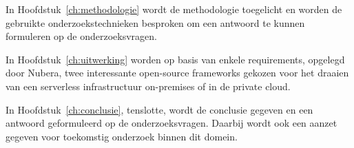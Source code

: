 In Hoofdstuk~\ref{ch:methodologie} wordt de methodologie toegelicht en worden de gebruikte onderzoekstechnieken besproken om een antwoord te kunnen formuleren op de onderzoeksvragen.

In Hoofdstuk~\ref{ch:uitwerking} worden op basis van enkele requirements, opgelegd door Nubera, twee interessante open-source frameworks gekozen voor het draaien van een serverless infrastructuur on-premises of in de private cloud.


In Hoofdstuk~\ref{ch:conclusie}, tenslotte, wordt de conclusie gegeven en een antwoord geformuleerd op de onderzoeksvragen. Daarbij wordt ook een aanzet gegeven voor toekomstig onderzoek binnen dit domein.

